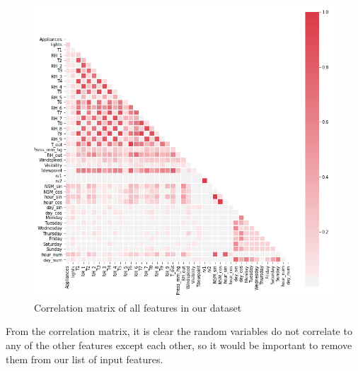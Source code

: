 \documentclass{article}
\begin{document}
\begin{figure}[H]
\centering
\includegraphics[width=1\textwidth, keepaspectratio]{imgs/all-corr.png}
\caption{Correlation matrix of all features in our dataset}
\end{figure}
\noindent
From the correlation matrix, it is clear the random variables do not correlate to any of the other features except each other, so it would be important to remove them from our list of input features. 
\end{document}
